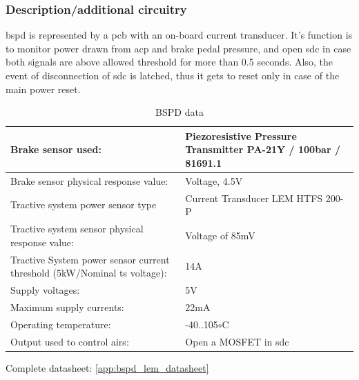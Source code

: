 
\subsubsection{Description/additional circuitry}

\Gls{bspd} is represented by a \gls{pcb} with an on-board current transducer. It’s function is to monitor
power drawn from \gls{acp} and brake pedal pressure, and open \gls{sdc} in case both signals are above
allowed threshold for more than 0.5 seconds. Also, the event of disconnection of \gls{sdc} is latched,
thus it gets to reset only in case of the main power reset.


\begin{table}[H]
	\centering
	\caption{BSPD data}
	\begin{tabularx}{\textwidth}{|X|X|}
		\hline
		Brake sensor used: & Piezoresistive Pressure Transmitter PA-21Y / 100bar / 81691.1 \\[\TableSize]
		\hline
		Brake sensor physical response value: & Voltage, 4.5V \\[\TableSize]
		\hline
		Tractive system power sensor type & Current Transducer LEM HTFS 200-P \\[\TableSize]
		\hline
		Tractive system sensor physical response value: & Voltage of 85mV \\[\TableSize]
		\hline
		Tractive System power sensor current threshold (5kW/Nominal \gls{ts} voltage): & 14A \\[\TableSize]
		\hline
		Supply voltages: & 5V \\[\TableSize]
		\hline
		Maximum supply currents: & 22mA \\[\TableSize]
		\hline
		Operating temperature: & -40..105$\circ$C\\[\TableSize]
		\hline
		Output used to control \glspl{air}: & Open a MOSFET in \gls{sdc} \\[\TableSize]
		\hline
	\end{tabularx}%
	\label{tab:bspd}%
\end{table}%

Complete datasheet: \ref{app:bspd_lem_datasheet}

